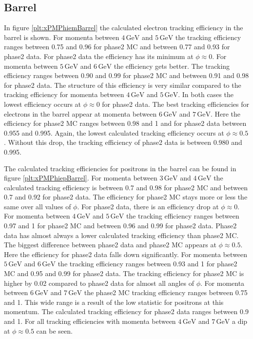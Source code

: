\documentclass[a4paper,11pt,twosided,final,german,openbib,pdftex,listof=totoc,bibliography=totoc]{scrbook}
\begin{document}
\newpage

\subsection{Barrel}

In figure \ref{plt:xPMPhiemBarrel} the calculated electron tracking efficiency in the barrel is shown. For momenta between $4\,\textrm{GeV}$ and $5\,\textrm{GeV}$ the tracking efficiency ranges between 0.75 and 0.96 for phase2 MC and between 0.77 and 0.93 for phase2 data. For phase2 data the efficiency has its minimum at $\phi \approx 0$. For momenta between $5\,\textrm{GeV}$ and $6\,\textrm{GeV}$ the efficiency gets better. The tracking efficiency ranges between 0.90 and 0.99 for phase2 MC and between 0.91 and 0.98 for phase2 data. The structure of this efficiency is very similar compared to the tracking efficiency for momenta between $4\,\textrm{GeV}$ and $5\,\textrm{GeV}$. In both cases the lowest efficiency occurs at $\phi \approx 0$ for phase2 data. The best tracking efficiencies for electrons in the barrel appear at momenta between $6\,\textrm{GeV}$ and $7\,\textrm{GeV}$. Here the efficiency for phase2 MC ranges between 0.98 and 1 and for phase2 data between 0.955 and 0.995. Again, the lowest calculated tracking efficiency occurs at  $\phi \approx 0.5$. Without this drop, the tracking efficiency of phase2 data is between 0.980 and 0.995. 

The calculated tracking efficiencies for positrons in the barrel can be found in figure \ref{plt:xPMPhiepBarrel}. 
For momenta between $3\,\textrm{GeV}$ and $4\,\textrm{GeV}$ the calculated tracking efficiency is between 0.7 and 0.98 for phase2 MC and between 0.7 and 0.92 for phase2 data. The efficiency for phase2 MC stays more or less the same over all values of $\phi$. For phase2 data, there is an efficiency drop at $\phi \approx 0$.
For momenta between $4\,\textrm{GeV}$ and $5\,\textrm{GeV}$ the tracking efficiency ranges between 0.97 and 1 for phase2 MC and between 0.96 and 0.99 for phase2 data. Phase2 data has almost always a lower calculated tracking efficiency than phase2 MC.
The biggest difference between phase2 data and phase2 MC appears at $\phi \approx 0.5$. Here the efficiency for phase2 data falls down significantly. 
For momenta between $5\,\textrm{GeV}$ and $6\,\textrm{GeV}$ the tracking efficiency ranges between 0.93 and 1 for phase2 MC and 0.95  and 0.99 for phase2 data. The tracking efficiency for phase2 MC is higher by 0.02 compared to phase2 data for almost all  angles of $\phi$. 
For momenta between $6\,\textrm{GeV}$ and $7\,\textrm{GeV}$ the phase2 MC tracking efficiency ranges between 0.75 and 1. This wide range is a result of the low statistic for positrons at this momentum. The calculated tracking efficiency for phase2 data ranges between 0.9 and 1. For all tracking efficiencies with momenta between $4\,\textrm{GeV}$ and $7\,\textrm{GeV}$ a dip at $\phi \approx 0.5$ can be seen.
\end{document}
